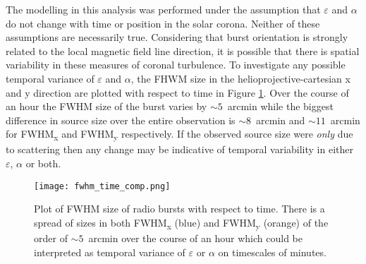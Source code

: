 
The modelling in this analysis was performed under the assumption that $\varepsilon$ and $\alpha$ do not change with time or position in the solar corona. Neither of these assumptions are necessarily true. Considering that burst orientation is strongly related to the local magnetic field line direction, it is possible that there is spatial variability in these measures of coronal turbulence. To investigate any possible temporal variance of $\varepsilon$ and $\alpha$, the FHWM size in the helioprojective-cartesian x and y direction are plotted with respect to time in Figure \ref{fig:fwhm_time_comp}. Over the course of an hour the FWHM size of the burst varies by $\sim 5$~arcmin while the biggest difference in source size over the entire observation is $\sim 8$~arcmin and $\sim 11$~arcmin for FWHM\textsubscript{x} and FWHM\textsubscript{y} respectively. If the observed source size were \textit{only} due to scattering then any change may be indicative of temporal variability in either $\varepsilon$, $\alpha$ or both.

\begin{figure}[ht]
\centering
\texttt{[image: fwhm\_time\_comp.png]}
\caption[Plot of FWHM size of radio bursts with respect to time.]{Plot of FWHM size of radio bursts with respect to time. There is a spread of sizes in both FWHM\textsubscript{x} (blue) and FWHM\textsubscript{y} (orange) of the order of $\sim 5$~arcmin over the course of an hour which could be interpreted as temporal variance of $\varepsilon$ or $\alpha$ on timescales of minutes.}
\label{fig:fwhm_time_comp}
\end{figure}


